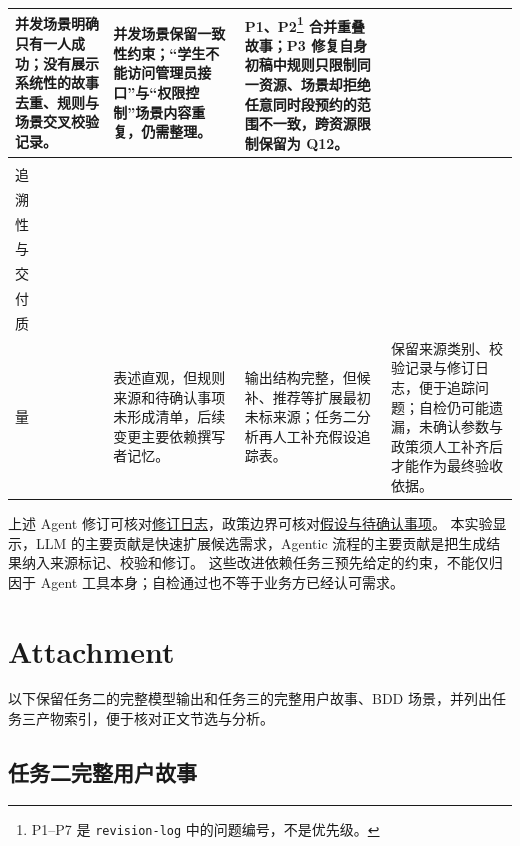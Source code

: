 \documentclass[11pt,a4paper]{article}
\begin{document}
\begin{longtable}{@{}p{}p{}p{}p{}@{}}
    并发场景明确只有一人成功；没有展示系统性的故事去重、规则与场景交叉校验记录。
    &
    并发场景保留一致性约束；“学生不能访问管理员接口”与“权限控制”场景内容重复，仍需整理。
    &
    P1、P2\footnote[1]{P1--P7 是 \texttt{revision-log} 中的问题编号，不是优先级。} 合并重叠故事；P3 修复自身初稿中规则只限制同一资源、场景却拒绝任意同时段预约的范围不一致，跨资源限制保留为 Q12。 \\
    \midrule
    \comparisonrowtitle{可\\追\\溯\\性\\与\\交\\付\\质\\量} &
    表述直观，但规则来源和待确认事项未形成清单，后续变更主要依赖撰写者记忆。
    &
    输出结构完整，但候补、推荐等扩展最初未标来源；任务二分析再人工补充假设追踪表。
    &
    保留来源类别、校验记录与修订日志，便于追踪问题；自检仍可能遗漏，未确认参数与政策须人工补齐后才能作为最终验收依据。 \\
\end{longtable}
\endgroup

上述 Agent 修订可核对\href{run:task3/output/revision-log.md}{修订日志}，政策边界可核对\href{run:task3/output/assumptions.md}{假设与待确认事项}。
本实验显示，LLM 的主要贡献是快速扩展候选需求，Agentic 流程的主要贡献是把生成结果纳入来源标记、校验和修订。
这些改进依赖任务三预先给定的约束，不能仅归因于 Agent 工具本身；自检通过也不等于业务方已经认可需求。
\clearpage
\appendix
\section{Attachment}
以下保留任务二的完整模型输出和任务三的完整用户故事、BDD 场景，并列出任务三产物索引，便于核对正文节选与分析。

\subsection{任务二完整用户故事}\label{app:llm-stories}
\end{document}
